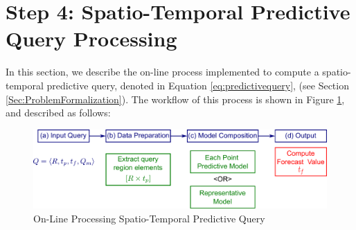 \section{Step 4: Spatio-Temporal Predictive Query Processing}
\label{Sec:SpatioTemporalQueryProcessing}	

In this section, we describe the on-line process implemented to compute a spatio-temporal predictive query, denoted in Equation \ref{eq:predictivequery}, (see Section \ref{Sec:ProblemFormalization}). The workflow of this process is shown in Figure \ref{Fig:OnLineQP}, and described as follows: 

\begin{figure}[!ht]
	\centering
	\includegraphics[scale=0.35]{../Figures/Query_Processing_Corrections}
	\caption{On-Line Processing Spatio-Temporal Predictive Query}
	\label{Fig:OnLineQP}
\end{figure}

